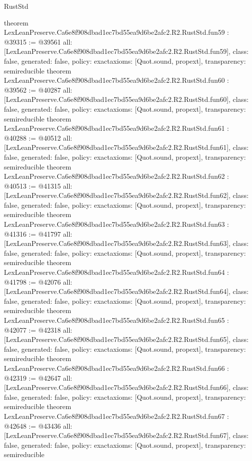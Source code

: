 \begin{lexlean}{RustStd}
\begin{coremodule}
{}
theorem LexLeanPreserve.Ca6e8f908dbad1ec7bd55ea9d6be2afc2.R2.RustStd.fun59 : @39315 := @39561 {
  all: [LexLeanPreserve.Ca6e8f908dbad1ec7bd55ea9d6be2afc2.R2.RustStd.fun59],
  class: false,
  generated: false,
  policy: exact{axioms: [Quot.sound, propext]},
  transparency: semireducible
}
theorem LexLeanPreserve.Ca6e8f908dbad1ec7bd55ea9d6be2afc2.R2.RustStd.fun60 : @39562 := @40287 {
  all: [LexLeanPreserve.Ca6e8f908dbad1ec7bd55ea9d6be2afc2.R2.RustStd.fun60],
  class: false,
  generated: false,
  policy: exact{axioms: [Quot.sound, propext]},
  transparency: semireducible
}
theorem LexLeanPreserve.Ca6e8f908dbad1ec7bd55ea9d6be2afc2.R2.RustStd.fun61 : @40288 := @40512 {
  all: [LexLeanPreserve.Ca6e8f908dbad1ec7bd55ea9d6be2afc2.R2.RustStd.fun61],
  class: false,
  generated: false,
  policy: exact{axioms: [Quot.sound, propext]},
  transparency: semireducible
}
theorem LexLeanPreserve.Ca6e8f908dbad1ec7bd55ea9d6be2afc2.R2.RustStd.fun62 : @40513 := @41315 {
  all: [LexLeanPreserve.Ca6e8f908dbad1ec7bd55ea9d6be2afc2.R2.RustStd.fun62],
  class: false,
  generated: false,
  policy: exact{axioms: [Quot.sound, propext]},
  transparency: semireducible
}
theorem LexLeanPreserve.Ca6e8f908dbad1ec7bd55ea9d6be2afc2.R2.RustStd.fun63 : @41316 := @41797 {
  all: [LexLeanPreserve.Ca6e8f908dbad1ec7bd55ea9d6be2afc2.R2.RustStd.fun63],
  class: false,
  generated: false,
  policy: exact{axioms: [Quot.sound, propext]},
  transparency: semireducible
}
theorem LexLeanPreserve.Ca6e8f908dbad1ec7bd55ea9d6be2afc2.R2.RustStd.fun64 : @41798 := @42076 {
  all: [LexLeanPreserve.Ca6e8f908dbad1ec7bd55ea9d6be2afc2.R2.RustStd.fun64],
  class: false,
  generated: false,
  policy: exact{axioms: [Quot.sound, propext]},
  transparency: semireducible
}
theorem LexLeanPreserve.Ca6e8f908dbad1ec7bd55ea9d6be2afc2.R2.RustStd.fun65 : @42077 := @42318 {
  all: [LexLeanPreserve.Ca6e8f908dbad1ec7bd55ea9d6be2afc2.R2.RustStd.fun65],
  class: false,
  generated: false,
  policy: exact{axioms: [Quot.sound, propext]},
  transparency: semireducible
}
theorem LexLeanPreserve.Ca6e8f908dbad1ec7bd55ea9d6be2afc2.R2.RustStd.fun66 : @42319 := @42647 {
  all: [LexLeanPreserve.Ca6e8f908dbad1ec7bd55ea9d6be2afc2.R2.RustStd.fun66],
  class: false,
  generated: false,
  policy: exact{axioms: [Quot.sound, propext]},
  transparency: semireducible
}
theorem LexLeanPreserve.Ca6e8f908dbad1ec7bd55ea9d6be2afc2.R2.RustStd.fun67 : @42648 := @43436 {
  all: [LexLeanPreserve.Ca6e8f908dbad1ec7bd55ea9d6be2afc2.R2.RustStd.fun67],
  class: false,
  generated: false,
  policy: exact{axioms: [Quot.sound, propext]},
  transparency: semireducible
}
\end{coremodule}
\end{lexlean}
